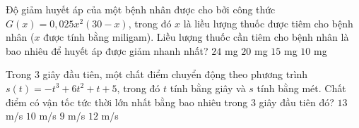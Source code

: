 \begin{ex}%
	Độ giảm huyết áp của một bệnh nhân được cho bởi công thức\break $G(x)=0{,}025 x^{2}(30-x)$, trong đó $x$ là liều lượng thuốc được tiêm cho bệnh nhân ($x$ được  tính bằng miligam). Liều lượng thuốc cần tiêm cho bệnh nhân là bao nhiêu để huyết áp được giảm nhanh nhất?
	 \choice
		 {$24$ mg}
		{\True $20$  mg}
		 {$15$ mg}
		{$10$  mg}
\end{ex}

\begin{ex}%
	Trong $3$ giây đầu tiên, một chất điểm chuyển động theo phương trình\break $s(t)=-t^3+6t^2+t+5$, trong đó $t$ tính bằng giây và $s$ tính bằng mét. Chất điểm có vận tốc  tức thời lớn nhất bằng bao nhiêu trong $3$ giây đầu tiên đó?
	\choice 
		 {$13$ m/s}
		 {$10$ m/s}
		 {$9$ m/s}
		 {\True $12$ m/s}
\end{ex}

